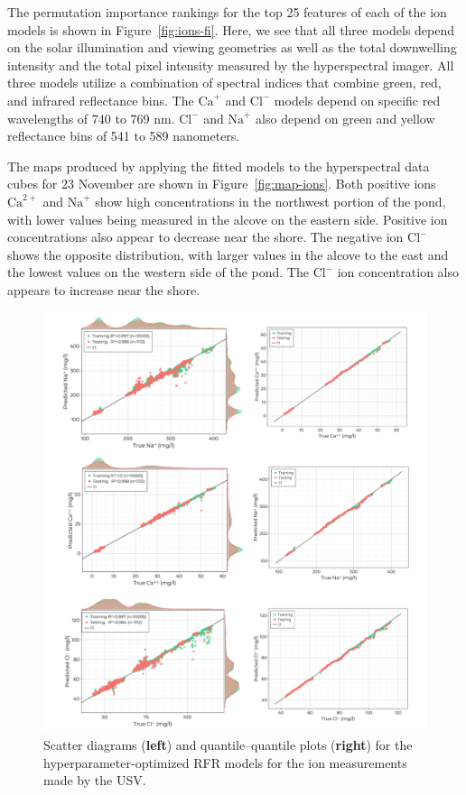 \documentclass[remotesensing,article,accept,pdftex,moreauthors]{Definitions/mdpi}
\begin{document}
The permutation importance rankings for the top 25 features of each of the ion models is shown in Figure~\ref{fig:ions-fi}. Here, we see that all three models depend on the solar illumination and viewing geometries as well as the total downwelling intensity and the total pixel intensity measured by the hyperspectral imager. All three models utilize a combination of spectral indices that combine green, red, and infrared reflectance bins. The $\textrm{Ca}^{+}$ and $\textrm{Cl}^{-}$ models depend on specific red wavelengths of 740 to 769 nm. $\textrm{Cl}^{-}$ and $\textrm{Na}^{+}$ also depend on green and yellow reflectance bins of 541 to 589 nanometers.

The maps produced by applying the fitted models to the hyperspectral data cubes for 23 November are shown in Figure~\ref{fig:map-ions}. Both positive ions $\mathrm{Ca}^{2+}$ and $\mathrm{Na}^{+}$ show high concentrations in the northwest portion of the pond, with lower values being measured in the alcove on the eastern side. Positive ion concentrations also appear to decrease near the shore. The negative ion $\mathrm{Cl}^{-}$ shows the opposite distribution, with larger values in the alcove to the east and the lowest values on the western side of the pond. The $\mathrm{Cl}^{-}$ ion concentration also appears to increase near the shore.

\begin{figure}[H]

\vspace{-0.15in}
\hspace{-6pt}\includegraphics[width=\columnwidth]{figures/results/fits/ions-fitres.pdf}
\vspace{-0.1in}
\caption{Scatter diagrams (\textbf{left}) and quantile--quantile plots (\textbf{right}) for the hyperparameter-optimized RFR models for the ion measurements made by the USV.\label{fig:ions-fit}}
\end{figure}  
\end{document}
